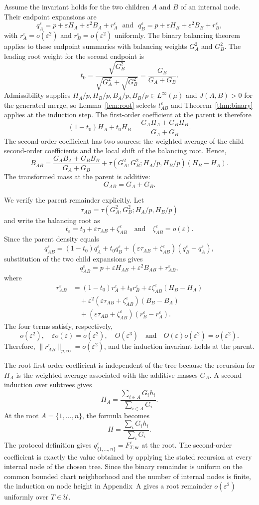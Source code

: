 \documentclass[11pt]{article}
\theoremstyle{plain}
\theoremstyle{definition}
\theoremstyle{definition}
\newcommand{\eps}{\varepsilon}
\newcommand{\wv}{\mathbf w}
\newcommand{\Fw}[1]{F_{#1,\wv}^{\eps}}
\begin{document}
Assume the invariant holds for the two children $A$ and $B$ of an internal node. Their endpoint expansions are
\[
q_A^\eps=p+\eps H_A+\eps^2B_A+r_A^\eps
\,\,\,\,\text{and}\,\,\,\,
q_B^\eps=p+\eps H_B+\eps^2B_B+r_B^\eps,
\]
with $r_A^\eps=o(\eps^2)$ and $r_B^\eps=o(\eps^2)$ uniformly. The binary balancing theorem applies to these endpoint summaries with balancing weights $G_A^2$ and $G_B^2$. The leading root weight for the second endpoint is
\[
t_0=\frac{\sqrt{G_B^2}}{\sqrt{G_A^2}+\sqrt{G_B^2}}=\frac{G_B}{G_A+G_B}.
\]
Admissibility supplies $H_A/p,H_B/p,B_A/p,B_B/p\in L^\infty(\mu)$ and $J(A,B)>0$ for the generated merge, so Lemma~\ref{lem:root} selects $t_{AB}^\eps$ and Theorem~\ref{thm:binary} applies at the induction step.
The first-order coefficient at the parent is therefore
\[
(1-t_0)H_A+t_0H_B
=\frac{G_AH_A+G_BH_B}{G_A+G_B}.
\]
The second-order coefficient has two sources: the weighted average of the child second-order coefficients and the local shift of the balancing root. Hence,
\[
B_{AB}=\frac{G_AB_A+G_BB_B}{G_A+G_B}
+\tau(G_A^2,G_B^2;H_A/p,H_B/p)(H_B-H_A).
\]
The transformed mass at the parent is additive:
\[
G_{AB}=G_A+G_B.
\]

We verify the parent remainder explicitly. Let
\[
\tau_{AB}=\tau(G_A^2,G_B^2;H_A/p,H_B/p)
\]
and write the balancing root as
\[
t_\eps=t_0+\eps\tau_{AB}+\zeta_{AB}^\eps
\quad\text{and}\quad
\zeta_{AB}^\eps=o(\eps).
\]
Since the parent density equals
\[
q_{AB}^\eps
=(1-t_0)q_A^\eps+t_0q_B^\eps
+(\eps\tau_{AB}+\zeta_{AB}^\eps)
 (q_B^\eps-q_A^\eps),
\]
substitution of the two child expansions gives
\[
q_{AB}^\eps
=p+\eps H_{AB}+\eps^2B_{AB}+r_{AB}^\eps,
\]
where
\[
\begin{aligned}
r_{AB}^\eps
&=(1-t_0)r_A^\eps+t_0r_B^\eps
  +\eps\zeta_{AB}^\eps(H_B-H_A)\\
&\quad+\eps^2(\eps\tau_{AB}+\zeta_{AB}^\eps)(B_B-B_A)\\
&\quad+(\eps\tau_{AB}+\zeta_{AB}^\eps)(r_B^\eps-r_A^\eps).
\end{aligned}
\]
The four terms satisfy, respectively,
\[
o(\eps^2),
\quad
\eps o(\eps)=o(\eps^2),
\quad
O(\eps^3)
\quad\text{and}\quad
O(\eps)o(\eps^2)=o(\eps^2).
\]
Therefore, $\|r_{AB}^\eps\|_{p,\infty}=o(\eps^2)$, and the induction invariant holds at the parent.


The root first-order coefficient is independent of the tree because the recursion for $H_A$ is the weighted average associated with the additive masses $G_A$. A second induction over subtrees gives
\[
H_A=\frac{\sum_{i\in A}G_ih_i}{\sum_{i\in A}G_i}.
\]
At the root $A=\{1,\ldots,n\}$, the formula becomes
\[H=\frac{\sum_iG_ih_i}{\sum_iG_i}.\]
The protocol definition gives $q_{\{1,\ldots,n\}}^\eps=\Fw{T}$ at the root. The second-order coefficient is exactly the value obtained by applying the stated recursion at every internal node of the chosen tree. Since the binary remainder is uniform on the common bounded chart neighborhood and the number of internal nodes is finite, the induction on node height in Appendix~A gives a root remainder $o(\eps^2)$ uniformly over $T\in\mathcal U$.
\end{document}
